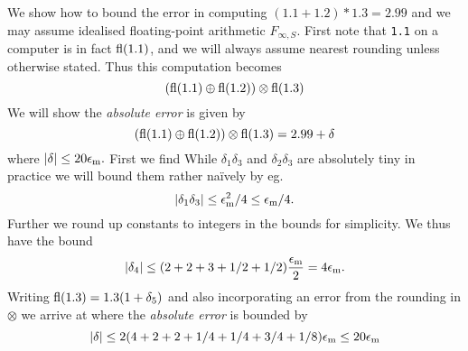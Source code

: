\begin{example} We show how to bound the error in computing $(1.1 + 1.2) * 1.3 = 2.99$ and we may assume idealised floating-point arithmetic $F_{\ensuremath{\infty},S}$. First note that \texttt{1.1} on a computer is in fact ${\rm fl}(1.1)$, and we will always assume nearest rounding unless otherwise stated. Thus this computation becomes
\[
({\rm fl}(1.1) \ensuremath{\oplus} {\rm fl}(1.2)) \ensuremath{\otimes} {\rm fl}(1.3)
\]
We will show the \emph{absolute error} is given by
\[
({\rm fl}(1.1) \ensuremath{\oplus} {\rm fl}(1.2)) \ensuremath{\otimes} {\rm fl}(1.3) = 2.99 + \ensuremath{\delta}
\]
where $|\ensuremath{\delta}| \ensuremath{\leq}  20 \ensuremath{\epsilon}_{\rm m}.$ First we find
While $\ensuremath{\delta}_1 \ensuremath{\delta}_3$ and $\ensuremath{\delta}_2 \ensuremath{\delta}_3$ are absolutely tiny in practice we will bound them rather naïvely by eg.
\[
|\ensuremath{\delta}_1 \ensuremath{\delta}_3| \ensuremath{\leq} \ensuremath{\epsilon}_{\rm m}^2/4 \ensuremath{\leq} \ensuremath{\epsilon}_{\rm m}/4.
\]
Further we round up constants to integers in the bounds for simplicity. We thus have the bound
\[
|\ensuremath{\delta}_4| \ensuremath{\leq} (2+2+3+1/2+1/2) {\ensuremath{\epsilon}_{\rm m} \over 2} = 4\ensuremath{\epsilon}_{\rm m}.
\]
Writing ${\rm fl}(1.3) = 1.3 (1+\ensuremath{\delta}_5)$ and also incorporating an error from the rounding in $\ensuremath{\otimes}$ we arrive at 
where the \emph{absolute error} is bounded by
\[
|\ensuremath{\delta}| \ensuremath{\leq} 2 (4 +  2 + 2 + 1/4 + 1/4 + 3/4 + 1/8) \ensuremath{\epsilon}_{\rm m} \ensuremath{\leq} 20 \ensuremath{\epsilon}_{\rm m}
\]
\end{example}

